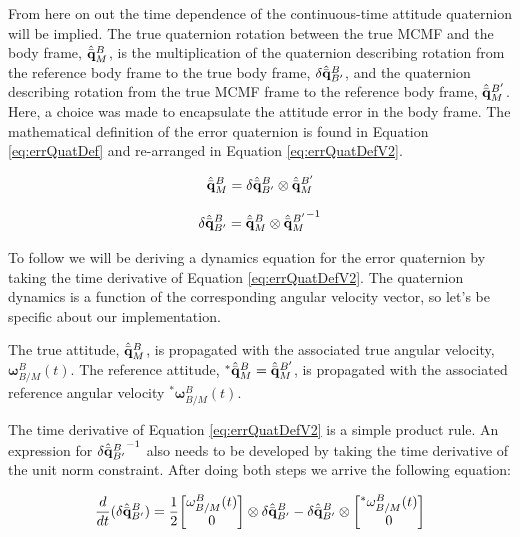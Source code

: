 \documentclass[conf]{new-aiaa}
\newcommand{\vect}[1]{\mathbf{#1}}
\newcommand{\qBM}{\hat{\Bar{\mathbf{q}}}^B_{M}}    %
\newcommand{\qUnitGeneric}{\hat{\Bar{\mathbf{q}}}}
\newcommand{\qRef}{^*\hat{\Bar{\mathbf{q}}}^B_{M}}
\newcommand{\wBMRef}{^*\vect{\omega}^B_{B/M}}
\newcommand{\errQuat}{\delta\qUnitGeneric^{B}_{B'}}
\newcommand{\errQuatInv}{{\delta\qUnitGeneric^{B}_{B'}}^{-1}}
\newcommand{\wBM}{\vect{\omega}^B_{B/M}}
\begin{document}
From here on out the time dependence of the continuous-time attitude quaternion will be implied. The true quaternion rotation between the true MCMF and the body frame, $\qBM$, is the multiplication of the quaternion describing rotation from the reference body frame to the true body frame, $\errQuat$,  and the quaternion describing rotation from the true MCMF frame to the reference body frame, $\qUnitGeneric^{B'}_M$. Here, a choice was made to encapsulate the attitude error in the body frame. The mathematical definition of the error quaternion is found in Equation 
\ref{eq:errQuatDef} and re-arranged in Equation \ref{eq:errQuatDefV2}.

\begin{equation}
\qBM = \errQuat \otimes \qUnitGeneric^{B'}_M \\
\label{eq:errQuatDef}
\end{equation}


\begin{equation}
 \errQuat = \qBM \otimes {\qUnitGeneric^{B'}_M}^{-1}
\label{eq:errQuatDefV2}
\end{equation}


To follow we will be deriving a dynamics equation for the error quaternion by taking the time derivative of Equation \ref{eq:errQuatDefV2}. The quaternion dynamics is a function of the corresponding angular velocity vector, so let's be specific about our implementation.

The true attitude, $\qBM$, is propagated with the associated true angular velocity, $\wBM(t)$. The reference attitude, $\qRef = \qUnitGeneric^{B'}_M$, is propagated with the associated reference angular velocity $\wBMRef(t)$.  

The time derivative of Equation \ref{eq:errQuatDefV2} is a simple product rule. An expression for $\errQuatInv$ also needs to be developed by taking the time derivative of the unit norm constraint. After doing both steps we arrive the following equation:

\begin{equation}
 \frac{d}{dt}({\errQuat}) =
 \frac{1}{2}{
 \begin{bmatrix}
     \wBM(t) \\ 0
 \end{bmatrix}
 \otimes 
 \errQuat
 -
 \errQuat \otimes
  \begin{bmatrix}
     ^*\wBM(t) \\ 0
 \end{bmatrix}
 }
\label{eq:mekfDir1}
\end{equation}
\end{document}

